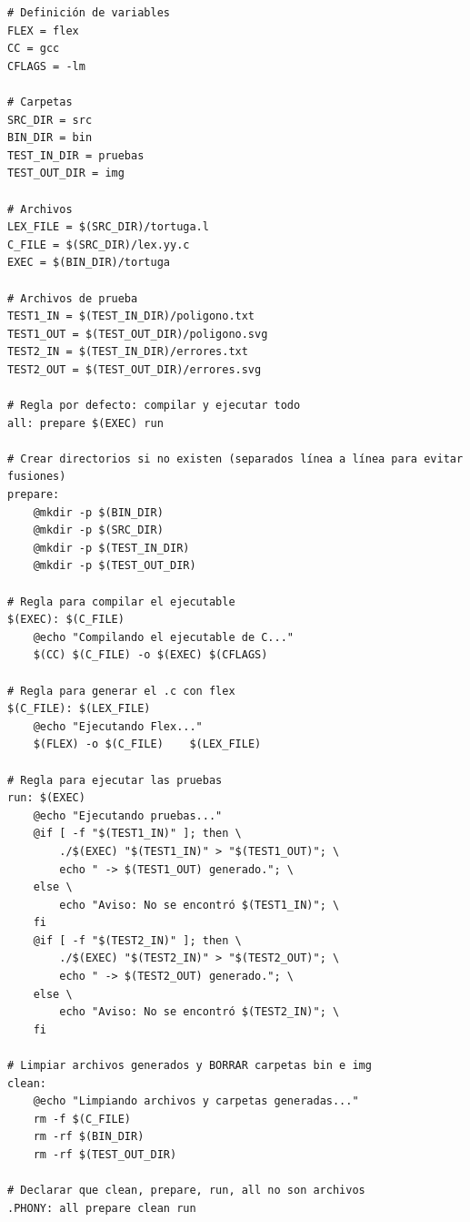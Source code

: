 \documentclass[12pt,a4paper]{article}
\begin{document}
\begin{verbatim}
# Definición de variables
FLEX = flex
CC = gcc
CFLAGS = -lm

# Carpetas
SRC_DIR = src
BIN_DIR = bin
TEST_IN_DIR = pruebas
TEST_OUT_DIR = img

# Archivos
LEX_FILE = $(SRC_DIR)/tortuga.l
C_FILE = $(SRC_DIR)/lex.yy.c
EXEC = $(BIN_DIR)/tortuga

# Archivos de prueba
TEST1_IN = $(TEST_IN_DIR)/poligono.txt
TEST1_OUT = $(TEST_OUT_DIR)/poligono.svg
TEST2_IN = $(TEST_IN_DIR)/errores.txt
TEST2_OUT = $(TEST_OUT_DIR)/errores.svg

# Regla por defecto: compilar y ejecutar todo
all: prepare $(EXEC) run

# Crear directorios si no existen (separados línea a línea para evitar fusiones)
prepare:
	@mkdir -p $(BIN_DIR)
	@mkdir -p $(SRC_DIR)
	@mkdir -p $(TEST_IN_DIR)
	@mkdir -p $(TEST_OUT_DIR)

# Regla para compilar el ejecutable
$(EXEC): $(C_FILE)
	@echo "Compilando el ejecutable de C..."
	$(CC) $(C_FILE) -o $(EXEC) $(CFLAGS)

# Regla para generar el .c con flex
$(C_FILE): $(LEX_FILE)
	@echo "Ejecutando Flex..."
	$(FLEX) -o $(C_FILE)    $(LEX_FILE)

# Regla para ejecutar las pruebas
run: $(EXEC)
	@echo "Ejecutando pruebas..."
	@if [ -f "$(TEST1_IN)" ]; then \
		./$(EXEC) "$(TEST1_IN)" > "$(TEST1_OUT)"; \
		echo " -> $(TEST1_OUT) generado."; \
	else \
		echo "Aviso: No se encontró $(TEST1_IN)"; \
	fi
	@if [ -f "$(TEST2_IN)" ]; then \
		./$(EXEC) "$(TEST2_IN)" > "$(TEST2_OUT)"; \
		echo " -> $(TEST2_OUT) generado."; \
	else \
		echo "Aviso: No se encontró $(TEST2_IN)"; \
	fi

# Limpiar archivos generados y BORRAR carpetas bin e img
clean:
	@echo "Limpiando archivos y carpetas generadas..."
	rm -f $(C_FILE)
	rm -rf $(BIN_DIR)
	rm -rf $(TEST_OUT_DIR)

# Declarar que clean, prepare, run, all no son archivos
.PHONY: all prepare clean run
\end{verbatim}
\end{document}
